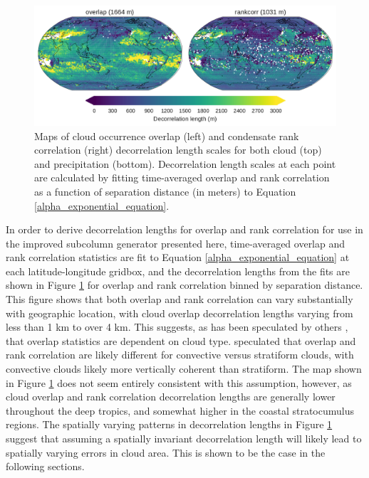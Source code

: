 \begin{figure}
\centering
\includegraphics[width=\columnwidth]{graphics/subgrid2_overlap_maps.pdf}
\caption{Maps of cloud occurrence overlap (left) and condensate rank correlation (right) decorrelation length scales for both cloud (top) and precipitation (bottom). Decorrelation length scales at each point are calculated by fitting time-averaged overlap and rank correlation as a function of separation distance (in meters) to Equation \ref{alpha_exponential_equation}.}
\label{subgrid2_overlap_maps}
\end{figure}

In order to derive decorrelation lengths for overlap and rank correlation for use in the improved subcolumn generator presented here, time-averaged overlap and rank correlation statistics are fit to Equation \ref{alpha_exponential_equation} at each latitude-longitude gridbox, and the decorrelation lengths from the fits are shown in Figure \ref{subgrid2_overlap_maps} for overlap and rank correlation binned by separation distance. This figure shows that both overlap and rank correlation can vary substantially with geographic location, with cloud overlap decorrelation lengths varying from less than 1 km to over 4 km. This suggests, as has been speculated by others \citep[e.g.]{pincus_et_al_2005}, that overlap statistics are dependent on cloud type. \cite{pincus_et_al_2005} speculated that overlap and rank correlation are likely different for convective versus stratiform clouds, with convective clouds likely more vertically coherent than stratiform. The map shown in Figure \ref{subgrid2_overlap_maps} does not seem entirely consistent with this assumption, however, as cloud overlap and rank correlation decorrelation lengths are generally lower throughout the deep tropics, and somewhat higher in the coastal stratocumulus regions. The spatially varying patterns in decorrelation lengths in Figure \ref{subgrid2_overlap_maps} suggest that assuming a spatially invariant decorrelation length will likely lead to spatially varying errors in cloud area. This is shown to be the case in the following sections.

